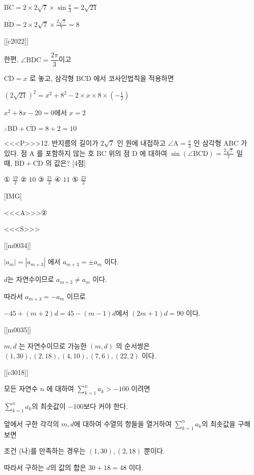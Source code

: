 \documentclass{oblivoir}
\begin{document}
$\overline{\mathrm{BC}}=2 \times 2 \sqrt{7} \times \sin \frac{\pi}{3}=2 \sqrt{21}$

$\overline{\mathrm{BD}}=2 \times 2 \sqrt{7} \times \frac{2 \sqrt{7}}{7}=8$

[[c2022]]

한편, $ \angle \mathrm{BDC} = \dfrac{2\pi}{3}$이고

$\overline{\mathrm{CD}}=x$ 로 놓고, 삼각형 $\mathrm{BCD}$ 에서 코사인법칙을 적용하면

$ \left( 2 \sqrt{21} \right)^{2}=x^{2}+8^{2}-2 \times x \times 8 \times \left( -\frac{1}{2} \right)$

$x^{2}+8x-20=0$에서 $x=2$

$\therefore \overline{\mathrm{BD}}+\overline{\mathrm{CD}}=8+2=10$


<<<P>>>12. 반지름의 길이가 $2 \sqrt{7}$ 인 원에 내접하고 $\angle \mathrm{A}=\frac{\pi}{3}$ 인 삼각형 $\mathrm{ABC}$ 가 있다. 점 $\mathrm{A}$ 를 포함하지 않는 호 $\mathrm{BC}$ 위의 점 $\mathrm{D}$ 에 대하여 $\sin (\angle \mathrm{BCD})=\frac{2 \sqrt{7}}{7}$ 일 때, $\overline{\mathrm{BD}}+\overline{\mathrm{CD}}$ 의 값은? [4점]

① $\frac{19}{2}$
② $10$
③ $\frac{21}{2}$
④ $11$
⑤ $\frac{23}{2}$

[IMG]

<<<A>>>②

<<<S>>>

[[m0034]]

$\left|a_{m}\right|=\left|a_{m+3}\right|$ 에서 $a_{m+3}=\pm a_{m}$ 이다.

$d$는 자연수이므로 $a_{m+3} \neq a_{m}$ 이다.

따라서 $a_{m+3}=-a_{m}$ 이므로

$-45+(m+2) d=45-(m-1) d$에서 $(2 m+1) d=90 $ 이다.

[[m0035]]

$m, d$ 는 자연수이므로 가능한 $(m, d)$ 의 순서쌍은 $(1,30),(2,18),(4,10),(7,6),(22,2)$ 이다.

[[c3018]]

모든 자연수 $n$ 에 대하여 $\sum_{k=1}^{n} a_{k}>-100$ 이려면 

$\sum_{k=1}^{n} a_{k}$의 최솟값이 $-100$보다 커야 한다.

앞에서 구한 각각의 $m,d$에 대하여 수열의 항들을 열거하여 $\sum_{k=1}^{n} a_{k}$의 최솟값을 구해보면

조건 (나)를 만족하는 경우는  $(1,30),(2,18)$ 뿐이다.

따라서 구하는 $d$의 값의 합은 $30+18=48$ 이다.
\end{document}
